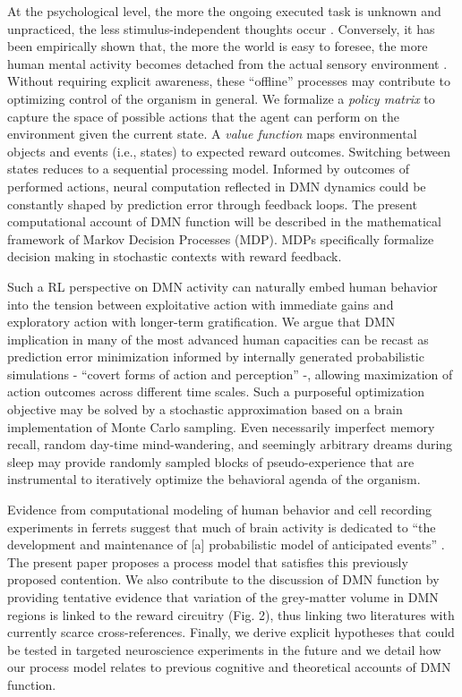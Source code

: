 \documentclass[10pt,letterpaper]{article}
\begin{document}
At the psychological level,
the more the ongoing executed task is unknown and unpracticed,
the less stimulus-independent thoughts occur
\citep{filler1973daydreaming, teasdale1995stimulus, christoff2016mind}.
Conversely,
it has been empirically shown that, the more the world is easy to foresee,
the more human mental activity
becomes detached from the actual sensory environment
\citep{antrobus1966studies, pope1978regulation, mason2007, weiss2006}.
Without requiring explicit awareness,
these ``offline'' processes may contribute
to optimizing control of the organism in general.
We formalize
a \textit{policy matrix} to capture the space of possible actions that
the agent can perform
on the environment given the current state. A \textit{value function}
maps environmental objects and events (i.e., states) to expected reward outcomes.
Switching between states reduces to a sequential processing model.
Informed by outcomes of performed actions, neural computation reflected in
DMN dynamics could be constantly shaped by prediction error through feedback loops.
The present computational account of DMN function will be described in the mathematical framework of Markov Decision Processes (MDP). MDPs specifically formalize decision making in stochastic contexts with reward feedback.



Such a RL perspective on DMN activity can naturally embed human behavior
into the tension between exploitative action with immediate gains and
exploratory action with longer-term gratification.
We argue that DMN implication in many
of the most advanced human capacities
can be recast as prediction error minimization
informed by internally generated probabilistic simulations
- ``covert forms of action and perception'' \citep{pezzulo2011grounding} -,
allowing maximization of action outcomes across different time scales.
Such a purposeful optimization objective
may be solved by a stochastic approximation
based on a brain implementation of Monte Carlo sampling.
Even necessarily imperfect memory recall,
random day-time mind-wandering, and
seemingly arbitrary dreams during sleep
may provide randomly sampled blocks of pseudo-experience  that are
instrumental to iteratively
optimize the behavioral agenda of the organism.



Evidence from computational modeling of human behavior \citep{kording2004bayesian} and cell recording experiments in ferrets \citep{fiser2004small} suggest that
much of brain activity is dedicated to
``the development and maintenance of [a]
probabilistic model of anticipated events''
\citep{raichle2005intrinsic}.
The present paper proposes a
process model that satisfies this previously proposed contention.
We also contribute to the discussion of DMN function
by providing tentative evidence that
variation of the grey-matter volume in DMN regions
is linked to the reward circuitry (Fig. 2),
thus linking two literatures with currently scarce cross-references.
Finally,
we derive explicit hypotheses that could be tested in targeted neuroscience
experiments in the future
and
we detail how our process model relates
to previous cognitive and theoretical accounts of DMN function.
\end{document}
